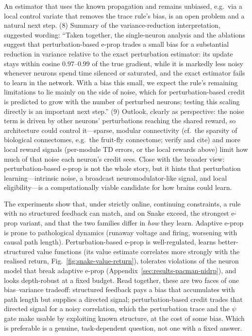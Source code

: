 \documentclass[10pt,twocolumn]{article}
\newcommand{\method}{perturbation-based e-prop}   %
\newcommand{\Method}{Perturbation-based e-prop}   %
\begin{document}
{An estimator that uses the known propagation and remains unbiased, e.g.\ via a
local control variate that removes the trace rule's bias, is an open problem
and a natural next step. (8) Summary of the variance-reduction interpretation, suggested wording:
``Taken together, the single-neuron analysis and the ablations suggest that
\method{} trades a small bias for a substantial reduction in variance
relative to the exact perturbation estimator: its update stays within cosine
$0.97$--$0.99$ of the true gradient, while it is markedly less noisy whenever
neurons spend time silenced or saturated, and the exact estimator fails to
learn in the network. With a bias this small, we expect the rule's remaining
limitations to lie mainly on the side of noise, which for perturbation-based
credit is predicted to grow with the number of perturbed neurons; testing this
scaling directly is an important next step.'' (9) Outlook, clearly as
perspective: the noise term is driven by other neurons' perturbations reaching
the shared reward, so architecture could control it---sparse, modular
connectivity (cf.\ the sparsity of biological connectomes, e.g.\ the fruit-fly
connectome; verify and cite) and more local reward signals (per-module TD
errors, or the local rewards above) limit how much of that noise each neuron's
credit sees. Close with the broader view: \method{} is not the whole
story, but it hints that perturbation learning---intrinsic noise, a broadcast
neuromodulator-like signal, and local eligibility---is a computationally
viable candidate for how brains could learn.}

The experiments show that, under strictly online, continuing constraints, a
rule with no structured feedback can match, and on Snake exceed, the strongest
e-prop variant, and that the two families differ in \emph{how} they learn. Adaptive e-prop is prone to pathological dynamics
(runaway voltage and firing, worsening with causal path length).
\Method{} is well-regulated, learns better-structured value functions
(its value estimate correlates more strongly with the realised return,
Fig.~\ref{fig:snake-value-return}),
tolerates violations of the neuron model that break adaptive e-prop
(Appendix~\ref{sec:results-pacman-nidrp}), and looks
depth-robust at a fixed budget. Read together, these are two faces of one
bias--variance tradeoff: structured feedback pays a bias that accumulates with
path length but supplies a directed signal; perturbation-based credit trades
that directed signal for a noisy correlation, which the perturbation trace and
the $\psi$ gate make usable by exploiting known structure, at the cost of some
bias. Which is preferable is a genuine, task-dependent
question, not one with a fixed answer.
\end{document}
